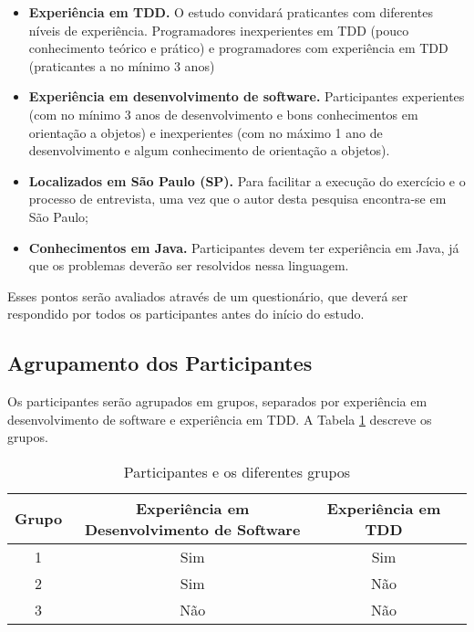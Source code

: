 \begin{itemize}
	\item \textbf{Experiência em TDD.} O estudo convidará praticantes com diferentes
	níveis de experiência. Programadores inexperientes em TDD (pouco conhecimento teórico e prático)
	e programadores com experiência em TDD (praticantes a no mínimo 3 anos)
	
	\item \textbf{Experiência em desenvolvimento de software.} Participantes
	experientes (com no mínimo 3 anos de desenvolvimento e bons conhecimentos em orientação a objetos) e 
	inexperientes (com no máximo 1 ano de desenvolvimento e algum conhecimento de orientação a objetos).

	\item \textbf{Localizados em São Paulo (SP).} Para facilitar a execução do exercício
	e o processo de entrevista, uma vez que o autor desta pesquisa encontra-se em São Paulo;

	\item \textbf{Conhecimentos em Java.} 
	Participantes devem ter experiência em Java, já que os problemas deverão ser resolvidos
	nessa linguagem.	
\end{itemize}

Esses pontos serão avaliados através de um questionário, que deverá ser
respondido por todos os participantes antes do início do estudo.

\subsection{Agrupamento dos Participantes}

Os participantes serão agrupados em grupos, separados por experiência em desenvolvimento
de software e experiência em TDD. A Tabela 
\ref{tab:participantes-e-grupos} descreve os grupos.

\begin{table}[h!]
	\caption{Participantes e os diferentes grupos}
	\begin{tabular}{| c | c | c | c |}
		\hline
		Grupo & Experiência em Desenvolvimento de Software & Experiência em TDD \\ 	\hline
		1 & Sim & Sim \\ 	\hline
		2 & Sim & Não \\ 	\hline
		3 & Não & Não \\ 	\hline
	\end{tabular}
	\label{tab:participantes-e-grupos}
\end{table}

